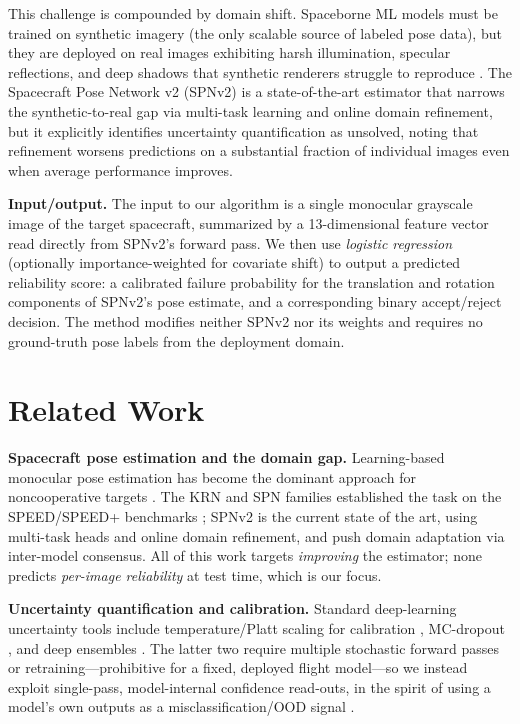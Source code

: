 \documentclass{article}
\begin{document}
This challenge is compounded by domain shift. Spaceborne ML models must be trained
on synthetic imagery (the only scalable source of labeled pose data), but they are
deployed on real images exhibiting harsh illumination, specular reflections, and
deep shadows that synthetic renderers struggle to reproduce
\citep{park_speed_2022, perez-villar_spacecraft_2024}. The Spacecraft Pose Network
v2 (SPNv2) \citep{park_robust_2024} is a state-of-the-art estimator that narrows
the synthetic-to-real gap via multi-task learning and online domain refinement, but
it explicitly identifies uncertainty quantification as unsolved, noting that
refinement worsens predictions on a substantial fraction of individual images even
when average performance improves.

\textbf{Input/output.} The input to our algorithm is a single monocular grayscale
image of the target spacecraft, summarized by a 13-dimensional feature vector read
directly from SPNv2's forward pass. We then use \emph{logistic regression}
(optionally importance-weighted for covariate shift) to output a predicted
reliability score: a calibrated failure probability for the translation and
rotation components of SPNv2's pose estimate, and a corresponding binary
accept/reject decision. The method modifies neither SPNv2 nor its weights and
requires no ground-truth pose labels from the deployment domain.

\section{Related Work}

\textbf{Spacecraft pose estimation and the domain gap.} Learning-based monocular
pose estimation has become the dominant approach for noncooperative targets
\citep{pauly_survey_2023, pasqualetto_cassinis_review_2019}. The KRN
\citep{park_towards_2019} and SPN families established the task on the SPEED/SPEED+
benchmarks \citep{park_speed_2022}; SPNv2 \citep{park_robust_2024} is the current
state of the art, using multi-task heads and online domain refinement, and
\citet{perez-villar_spacecraft_2024} push domain adaptation via inter-model
consensus. All of this work targets \emph{improving} the estimator; none predicts
\emph{per-image reliability} at test time, which is our focus.

\textbf{Uncertainty quantification and calibration.} Standard deep-learning
uncertainty tools include temperature/Platt scaling for calibration
\citep{guo_calibration_2017}, MC-dropout \citep{gal_dropout_2016}, and deep
ensembles \citep{lakshminarayanan_ensembles_2017}. The latter two require multiple
stochastic forward passes or retraining---prohibitive for a fixed, deployed
flight model---so we instead exploit single-pass, model-internal confidence
read-outs, in the spirit of using a model's own outputs as a misclassification/OOD
signal \citep{hendrycks_baseline_2017}.
\end{document}
